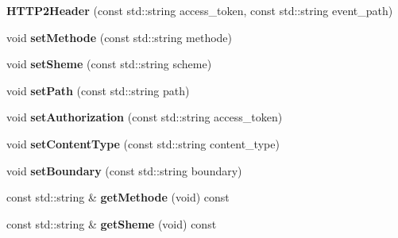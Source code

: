 \begin{DoxyCompactItemize}
\item 
\mbox{\label{classNetwork_1_1HTTP_1_1HTTP2Header_ac4ae5574f403cbdb1ae28a5282a5abef}} 
{\bfseries H\+T\+T\+P2\+Header} (const std\+::string access\+\_\+token, const std\+::string event\+\_\+path)
\item 
\mbox{\label{classNetwork_1_1HTTP_1_1HTTP2Header_a006f5aa2b6ff4c9b20a31a0fb952bcac}} 
void {\bfseries set\+Methode} (const std\+::string methode)
\item 
\mbox{\label{classNetwork_1_1HTTP_1_1HTTP2Header_acc8d27de57212e61b37f7b452520f234}} 
void {\bfseries set\+Sheme} (const std\+::string scheme)
\item 
\mbox{\label{classNetwork_1_1HTTP_1_1HTTP2Header_a7da3c09b66e3931d6d5f765ebf2b3a9c}} 
void {\bfseries set\+Path} (const std\+::string path)
\item 
\mbox{\label{classNetwork_1_1HTTP_1_1HTTP2Header_a8dc45f9e96c072939d8cecf647db1341}} 
void {\bfseries set\+Authorization} (const std\+::string access\+\_\+token)
\item 
\mbox{\label{classNetwork_1_1HTTP_1_1HTTP2Header_afccfca69595527cdafe5a7fbcd1888f4}} 
void {\bfseries set\+Content\+Type} (const std\+::string content\+\_\+type)
\item 
\mbox{\label{classNetwork_1_1HTTP_1_1HTTP2Header_a80aa6e5ca52a7e31f3689aa03f478e82}} 
void {\bfseries set\+Boundary} (const std\+::string boundary)
\item 
\mbox{\label{classNetwork_1_1HTTP_1_1HTTP2Header_ac958f22ab7db1c81b01913f964fc1022}} 
const std\+::string \& {\bfseries get\+Methode} (void) const
\item 
\mbox{\label{classNetwork_1_1HTTP_1_1HTTP2Header_a93e4ae0fc20208acf725909bed9ea117}} 
const std\+::string \& {\bfseries get\+Sheme} (void) const

\end{DoxyCompactItemize}
